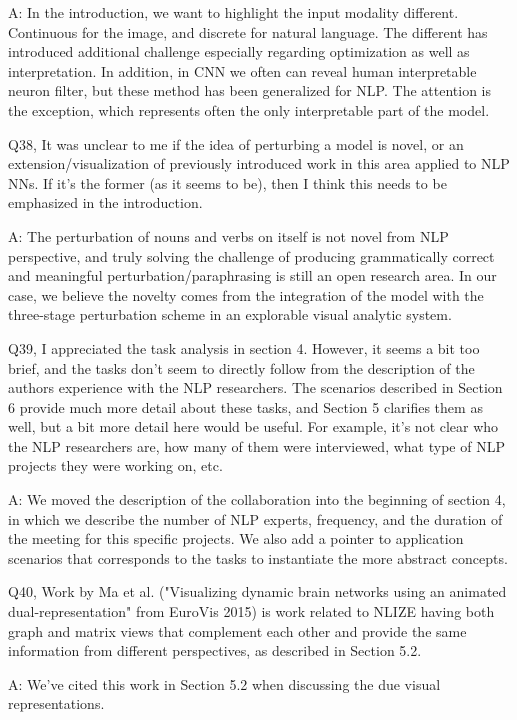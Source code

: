 A: In the introduction, we want to highlight the input modality different. Continuous for the image, and discrete for natural language. The different has introduced additional challenge especially regarding optimization as well as interpretation. In addition, in CNN we often can reveal human interpretable neuron filter, but these method has been generalized for NLP. The attention is the exception, which represents often the only interpretable part of the model.

Q38, It was unclear to me if the idea of perturbing a model is novel, or an extension/visualization of previously introduced work in this area applied to NLP NNs. If it's the former (as it seems to be), then I think this needs to be emphasized in the introduction.

A: The perturbation of nouns and verbs on itself is not novel from NLP perspective, and truly solving the challenge of producing grammatically correct and meaningful perturbation/paraphrasing is still an open research area. In our case, we believe the novelty comes from the integration of the model with the three-stage perturbation scheme in an explorable visual analytic system.

Q39, I appreciated the task analysis in section 4. However, it seems a bit too brief, and the tasks don't seem to directly follow from the description of the authors experience with the NLP researchers. The scenarios described in Section 6 provide much more detail about these tasks, and Section 5 clarifies them as well, but a bit more detail here would be useful. For example, it's not clear who the NLP researchers are, how many of them were interviewed, what type of NLP projects they were working on, etc.

A: We moved the description of the collaboration into the beginning of section 4, in which we describe the number of NLP experts, frequency, and the duration of the meeting for this specific projects. We also add a pointer to application scenarios that corresponds to the tasks to instantiate the more abstract concepts.

Q40, Work by Ma et al. ("Visualizing dynamic brain networks using an animated dual-representation" from EuroVis 2015) is work related to NLIZE having both graph and matrix views that complement each other and provide the same information from different perspectives, as described in Section 5.2.

A: We've cited this work in Section 5.2 when discussing the due visual representations.

